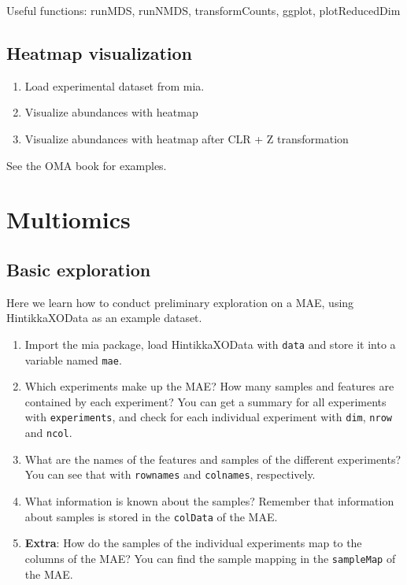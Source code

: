 \documentclass[
]{book}
\providecommand{\tightlist}{%
  \setlength{\itemsep}{0pt}\setlength{\parskip}{0pt}}
\begin{document}
Useful functions: runMDS, runNMDS, transformCounts, ggplot, plotReducedDim

\hypertarget{heatmap-visualization}{%
\subsection{Heatmap visualization}\label{heatmap-visualization}}

\begin{enumerate}
\def\labelenumi{\arabic{enumi}.}
\tightlist
\item
  Load experimental dataset from mia.
\item
  Visualize abundances with heatmap
\item
  Visualize abundances with heatmap after CLR + Z transformation
\end{enumerate}

See the OMA book for examples.

\hypertarget{multiomics}{%
\section{Multiomics}\label{multiomics}}

\hypertarget{basic-exploration}{%
\subsection{Basic exploration}\label{basic-exploration}}

Here we learn how to conduct preliminary exploration on a MAE, using
HintikkaXOData as an example dataset.

\begin{enumerate}
\def\labelenumi{\arabic{enumi}.}
\tightlist
\item
  Import the mia package, load HintikkaXOData with \texttt{data} and store it into a
  variable named \texttt{mae}.
\item
  Which experiments make up the MAE? How many samples and features are contained
  by each experiment? You can get a summary for all experiments with \texttt{experiments},
  and check for each individual experiment with \texttt{dim}, \texttt{nrow} and \texttt{ncol}.
\item
  What are the names of the features and samples of the different experiments?
  You can see that with \texttt{rownames} and \texttt{colnames}, respectively.
\item
  What information is known about the samples? Remember that information about
  samples is stored in the \texttt{colData} of the MAE.
\item
  \textbf{Extra}: How do the samples of the individual experiments map to the
  columns of the MAE? You can find the sample mapping in the \texttt{sampleMap}
  of the MAE.
\end{enumerate}
\end{document}

